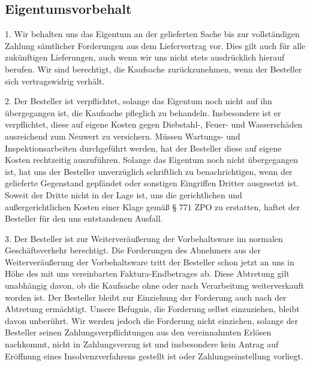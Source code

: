 \documentclass[a4paper, final, 11pt, oneside]{scrartcl}
\begin{document}
\begin{multicols}{2}
\section{Eigentumsvorbehalt}
1. Wir behalten uns das Eigentum an der gelieferten Sache bis zur vollständigen Zahlung sämtlicher Forderungen aus dem Liefervertrag vor. Dies gilt auch für alle zukünftigen Lieferungen, auch wenn wir uns nicht stets ausdrücklich hierauf berufen. Wir sind berechtigt, die Kaufsache zurückzunehmen, wenn der Besteller sich vertragswidrig verhält.

2. Der Besteller ist verpflichtet, solange das Eigentum noch nicht auf ihn übergegangen ist, die Kaufsache pfleglich zu behandeln. Insbesondere ist er verpflichtet, diese auf eigene Kosten gegen Diebstahl-, Feuer- und Wasserschäden ausreichend zum Neuwert zu versichern. Müssen Wartungs- und Inspektionsarbeiten durchgeführt werden, hat der Besteller diese auf eigene Kosten rechtzeitig auszuführen. Solange das Eigentum noch nicht übergegangen ist, hat uns der Besteller unverzüglich schriftlich zu benachrichtigen, wenn der gelieferte Gegenstand gepfändet oder sonstigen Eingriffen Dritter ausgesetzt ist. Soweit der Dritte nicht in der Lage ist, uns die gerichtlichen und außergerichtlichen Kosten einer Klage gemäß § 771 ZPO zu erstatten, haftet der Besteller für den uns entstandenen Ausfall.

3. Der Besteller ist zur Weiterveräußerung der Vorbehaltsware im normalen Geschäftsverkehr berechtigt. Die Forderungen des Abnehmers aus der Weiterveräußerung der Vorbehaltsware tritt der Besteller schon jetzt an uns in Höhe des mit uns vereinbarten Faktura-Endbetrages ab. Diese Abtretung gilt unabhängig davon, ob die Kaufsache ohne oder nach Verarbeitung weiterverkauft worden ist. Der Besteller bleibt zur Einziehung der Forderung auch nach der Abtretung ermächtigt. Unsere Befugnis, die Forderung selbst einzuziehen, bleibt davon unberührt. Wir werden jedoch die Forderung nicht einziehen, solange der Besteller seinen Zahlungsverpflichtungen aus den vereinnahmten Erlösen nachkommt, nicht in Zahlungsverzug ist und insbesondere kein Antrag auf Eröffnung eines Insolvenzverfahrens gestellt ist oder Zahlungseinstellung vorliegt.


\end{multicols}
\end{document}

